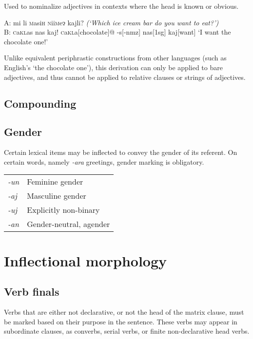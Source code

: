 \documentclass[a4paper,10pt,twoside,openright]{memoir}
\newcommand{\lilglot}{ɂ}
\newcommand{\famwordold}[5]{#1\textsc{#2}#3\textsc{#4}#5}
\begin{document}
Used to nominalize adjectives in contexts where the head is known or obvious.

\ex
\begingl
\glpreamble
A: mi li \famwordold{}{m}{asi}{h}{} \famwordold{}{n}{ii}{m}{e\lilglot} kajli? \textit{(`Which ice cream bar do you want to eat?')}\\
B: \famwordold{}{c}{a}{kl}{as} nas kaj!%
\endpreamble
\famwordold{}{c}{a}{kl}{a}[chocolate]@
-s[\sc -nmz]
nas[\sc 1sg]
kaj[want]
\glft `I want the chocolate one!'
\endgl
\xe

Unlike equivalent periphrastic constructions from other languages (such as English's `the chocolate one'), this derivation can only be applied to bare adjectives, and thus cannot be applied to relative clauses or strings of adjectives.

\subsection{Compounding}

\subsection{Gender}

Certain lexical items may be inflected to convey the gender of its referent. On certain words, namely \emph{-ara} greetings, gender marking is obligatory.

\begin{table}[ht]
    \centering
    \begin{tabular}{>{\em}ll}
    -un & Feminine gender \\
    -aj & Masculine gender \\
    -uj & Explicitly non-binary \\
    -an & Gender-neutral, agender \\
    \end{tabular}
\end{table}



\section{Inflectional morphology}

\subsection{Verb finals}

Verbs that are either not declarative, or not the head of the matrix clause, must be marked based on their purpose in the sentence. These verbs may appear in subordinate clauses, as converbs, serial verbs, or finite non-declarative head verbs.
\end{document}
